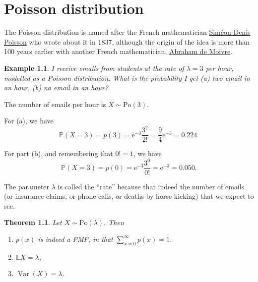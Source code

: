 \documentclass[
  a4paper,
]{book}
\providecommand{\tightlist}{%
  \setlength{\itemsep}{0pt}\setlength{\parskip}{0pt}}
\newtheorem{theorem}{Theorem}[chapter]
\theoremstyle{definition}
\theoremstyle{definition}
\newtheorem{example}{Example}[chapter]
\theoremstyle{definition}
\theoremstyle{definition}
\theoremstyle{remark}
\begin{document}
\hypertarget{L12-poisson}{%
\chapter{Poisson distribution}\label{L12-poisson}}

The Poisson distribution is named after the French mathematician \href{https://mathshistory.st-andrews.ac.uk/Biographies/Poisson/}{Siméon-Denis Poisson} who wrote about it in 1837, although the origin of the idea is more than 100 years earlier with another French mathematician, \href{https://mathshistory.st-andrews.ac.uk/Biographies/De_Moivre/}{Abraham de Moivre}.

\begin{example}
\emph{I receive emails from students at the rate of \(\lambda = 3\) per hour, modelled as a Poisson distribution. What is the probability I get (a) two email in an hour, (b) no email in an hour?}

The number of emails per hour is \(X \sim \mathrm{Po}(3)\).

For (a), we have
\[ \mathbb P(X = 3) = p(3) = \mathrm{e}^{-3} \frac{3^2}{2!} = \frac94 \mathrm{e}^{-3} = 0.224 . \]

For part (b), and remembering that \(0! = 1\), we have
\[ \mathbb P(X = 3) = p(0) = \mathrm{e}^{-3} \frac{3^0}{0!} = \mathrm{e}^{-3} = 0.050 . \]
\end{example}

The parameter \(\lambda\) is called the ``rate'' because that indeed the number of emails (or insurance claims, or phone calls, or deaths by horse-kicking) that we expect to see.

\begin{theorem}

Let \(X \sim \text{Po}(\lambda)\). Then

\begin{enumerate}
\def\labelenumi{\arabic{enumi}.}
\tightlist
\item
  \(p(x)\) is indeed a PMF, in that \(\displaystyle\sum_{x=0}^\infty p(x) = 1\).
\item
  \(\mathbb EX = \lambda\),
\item
  \(\operatorname{Var}(X) = \lambda\).
\end{enumerate}

\end{theorem}
\end{document}
